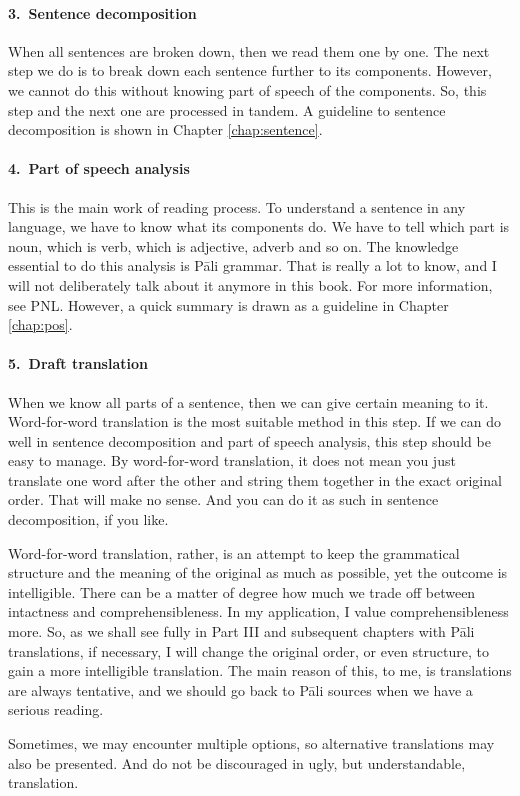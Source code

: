 \paragraph*{3.\ Sentence decomposition} When all sentences are broken down, then we read them one by one. The next step we do is to break down each sentence further to its components. However, we cannot do this without knowing part of speech of the components. So, this step and the next one are processed in tandem. A guideline to sentence decomposition is shown in Chapter \ref{chap:sentence}.

\paragraph*{4.\ Part of speech analysis} This is the main work of reading process. To understand a sentence in any language, we have to know what its components do. We have to tell which part is noun, which is verb, which is adjective, adverb and so on. The knowledge essential to do this analysis is P\=ali grammar. That is really a lot to know, and I will not deliberately talk about it anymore in this book. For more information, see PNL. However, a quick summary is drawn as a guideline in Chapter \ref{chap:pos}.

\paragraph*{5.\ Draft translation} When we know all parts of a sentence, then we can give certain meaning to it. Word-for-word translation is the most suitable method in this step. If we can do well in sentence decomposition and part of speech analysis, this step should be easy to manage. By word-for-word translation, it does not mean you just translate one word after the other and string them together in the exact original order. That will make no sense. And you can do it as such in sentence decomposition, if you like.

Word-for-word translation, rather, is an attempt to keep the grammatical structure and the meaning of the original as much as possible, yet the outcome is intelligible. There can be a matter of degree how much we trade off between intactness and comprehensibleness. In my application, I value comprehensibleness more. So, as we shall see fully in Part III and subsequent chapters with P\=ali translations, if necessary, I will change the original order, or even structure, to gain a more intelligible translation. The main reason of this, to me, is translations are always tentative, and we should go back to P\=ali sources when we have a serious reading.

Sometimes, we may encounter multiple options, so alternative translations may also be presented. And do not be discouraged in ugly, but understandable, translation.
